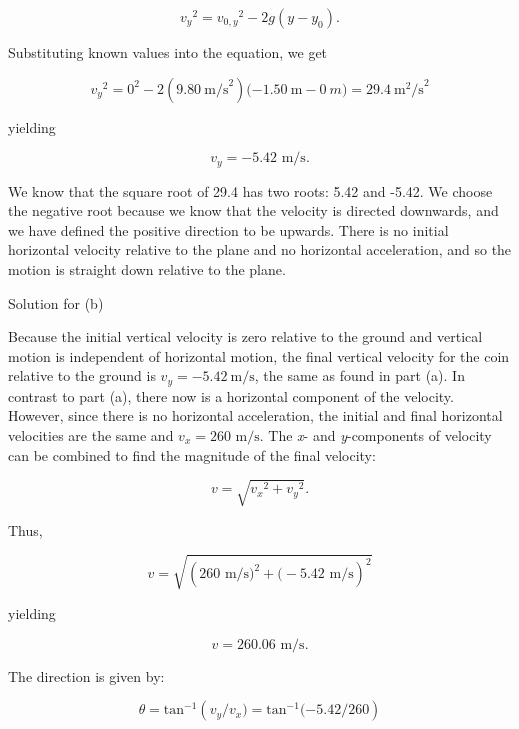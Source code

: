\documentclass[
]{book}
\newenvironment{tinysection}{}{}
\begin{document}
\leavevmode\hypertarget{eip-313}{}%
\[{{{{v_{y}}^{2} = {{v_{0,y}}^{2} - 2g}}({y - y_{0}})}\text{.}}{}\]

Substituting known values into the equation, we get

\leavevmode\hypertarget{eip-444}{}%
\[{{{v_{y}}^{2} = {0^{2} - 2}}(9\text{.}\text{80}\ \text{m/s}^{2}){( - 1}\text{.}\text{50}\ {\text{m} - 0\ m}{) = \text{29}}\text{.}4\ \text{m}^{2}\text{/s}^{2}}{}\]

yielding

\leavevmode\hypertarget{eip-877}{}%
\[{{v_{y} = {- 5}}\text{.}\text{42\ m/s.}}{}\]

We know that the square root of 29.4 has two roots: 5.42 and -5.42. We
choose the negative root because we know that the velocity is directed
downwards, and we have defined the positive direction to be upwards.
There is no initial horizontal velocity relative to the plane and no
horizontal acceleration, and so the motion is straight down relative to
the plane.

\begin{tinysection}

{Solution for (b)}

\end{tinysection}

Because the initial vertical velocity is zero relative to the ground and
vertical motion is independent of horizontal motion, the final vertical
velocity for the coin relative to the ground is
\(v_{y} = - 5.42\ \text{m/s}\), the same as found in part (a). In contrast
to part (a), there now is a horizontal component of the velocity.
However, since there is no horizontal acceleration, the initial and
final horizontal velocities are the same and
\({v_{x} = \text{260~m/s}}{}\). The \emph{x}- and \emph{y}-components of velocity
can be combined to find the magnitude of the final velocity:

\leavevmode\hypertarget{eip-558}{}%
\[{v = \sqrt{{v_{x}}^{2} + {v_{y}}^{2}}}\text{.}{}\]

Thus,

\leavevmode\hypertarget{eip-842}{}%
\[{v = \sqrt{(\text{260\ m/s}{{)^{2} + (} - 5}\text{.}\text{42\ m/s})^{2}}}{}\]

yielding

\leavevmode\hypertarget{eip-98}{}%
\[{{v = \text{260}}\text{.}\text{06\ m/s.}}{}\]

The direction is given by:

\leavevmode\hypertarget{eip-73}{}%
\[{{\theta = \text{tan}^{- 1}}({v_{y}/v_{x}}{) = \text{tan}^{- 1}}{( - 5}\text{.}{\text{42}/\text{260}})}{}\]
\end{document}
